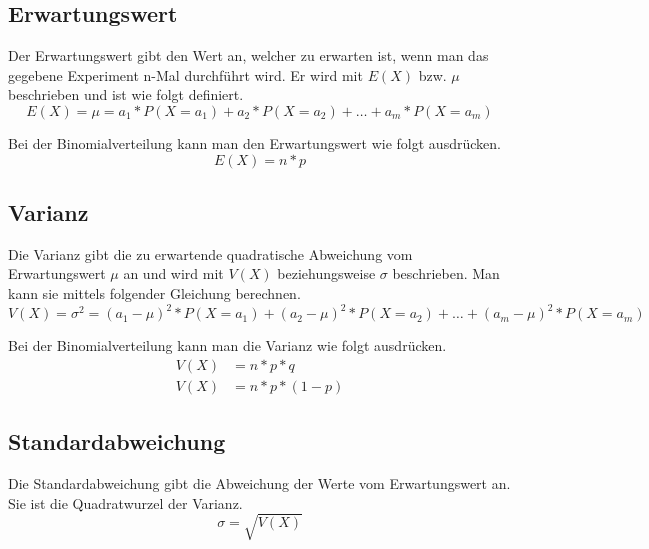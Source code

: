 \documentclass[a4paper]{article}
\begin{document}
		\subsection{Erwartungswert}
			Der Erwartungswert gibt den Wert an, welcher zu erwarten ist, wenn man das gegebene Experiment n-Mal durchführt wird. Er wird mit $E\left(X\right)$ bzw. $\mu$ beschrieben und ist wie folgt definiert.
			\begin{equation}
				E(X) = \mu = a_1 * P(X = a_1) + a_2 * P(X = a_2) + \dotsc + a_m * P(X = a_m)
			\end{equation}
			
			\noindent
			Bei der Binomialverteilung kann man den Erwartungswert wie folgt ausdrücken.
			\begin{equation}
				E(X) = n * p
			\end{equation}
		\subsection{Varianz}
			Die Varianz gibt die zu erwartende quadratische Abweichung vom Erwartungswert $\mu$ an und wird mit $V\left(X\right)$ beziehungsweise $\sigma$ beschrieben. Man kann sie mittels folgender Gleichung berechnen.
			\begin{equation}
				V(X) = \sigma^2 = (a_1 - \mu)^2 * P(X = a_1) + (a_2 - \mu)^2 * P(X = a_2) + \dotsc + (a_m - \mu)^2 * P(X = a_m)
			\end{equation}
			
			\noindent
			Bei der Binomialverteilung kann man die Varianz wie folgt ausdrücken.
			\begin{equation}
				\begin{split}
					V(X) &= n * p * q\\
					V(X) &= n * p * (1-p)
				\end{split}
			\end{equation}
		\subsection{Standardabweichung}
			Die Standardabweichung gibt die Abweichung der Werte vom Erwartungswert an. Sie ist die Quadratwurzel der Varianz.
			\begin{equation}
				\sigma = \sqrt{V(X)}
			\end{equation}
\end{document}
